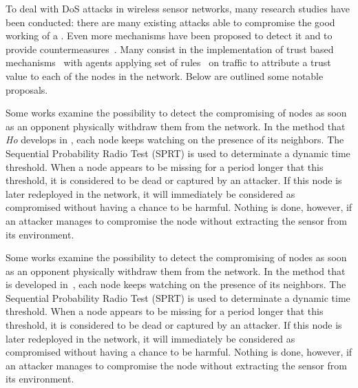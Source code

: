 To deal with DoS attacks in wireless sensor networks, many research studies have been conducted: there are many existing attacks able to compromise the good working of a \wsn.
Even more mechanisms have been proposed to detect it and to provide countermeasures~\cite{SSS11}.
Many consist in the implementation of trust based mechanisms~\cite{MC10,F-GRL07} with agents applying set of rules~\cite{RKKK13} on traffic to attribute a trust value to each of the nodes in the network.
Below are outlined some notable proposals.


Some works examine the possibility to detect the compromising of nodes as soon as an opponent physically withdraw them from the network.
In the method that \textit{Ho} develops in
\cite{Ho10},
each node keeps watching on the presence of its neighbors.
The Sequential Probability Radio Test (SPRT) is used to determinate a dynamic time threshold.
When a node appears to be missing for a period longer that this threshold, it is considered to be dead or captured by an attacker.
If this node is later redeployed in the network, it will immediately be considered as compromised without having a chance to be harmful.
Nothing is done, however, if an attacker manages to compromise the node without extracting the sensor from its environment.

Some works examine the possibility to detect the compromising of nodes as soon as an opponent physically withdraw them from the network.
In the method that is developed in~\cite{Ho10}, each node keeps watching on the presence of its neighbors.
The Sequential Probability Radio Test (SPRT) is used to determinate a dynamic time threshold.
When a node appears to be missing for a period longer that this threshold, it is considered to be dead or captured by an attacker.
If this node is later redeployed in the network, it will immediately be considered as compromised without having a chance to be harmful.
Nothing is done, however, if an attacker manages to compromise the node without extracting the sensor from its environment.

